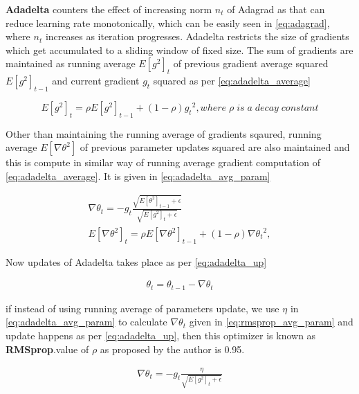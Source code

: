 \noindent \textbf{Adadelta}\cite{adadelta} counters the effect of increasing norm $n_t$ of Adagrad as that can reduce learning rate monotonically, which can be easily seen in \ref{eq:adagrad}, where $n_t$ increases as iteration progresses. Adadelta restricts the size of gradients which get accumulated to a sliding window of fixed size. The sum of gradients are maintained as running average $E[g^2]_t$ of previous gradient average squared $E[g^2]_{t-1}$  and current gradient ${g_t}$ squared as per \ref{eq:adadelta_average}

\begin{equation}\label{eq:adadelta_average}
E[g^2]_t=\rho E[g^2]_{t-1}+(1-\rho){g_t}^2, where \; \rho \; is \; a \; decay \; constant
\end{equation}

\noindent Other than maintaining the running average of gradients sqaured, running average $E[\nabla\theta^2]$  of previous parameter updates squared are also maintained and this is compute in similar way of running average gradient computation of \ref{eq:adadelta_average}. It is given in \ref{eq:adadelta_avg_param}

\begin{equation}\label{eq:adadelta_avg_param}
\begin{aligned}
\nabla\theta_{t}=-g_{t}\frac{\sqrt{E[\theta^2]_{t-1}+\epsilon}}{\sqrt{E[g^2]_{t}+\epsilon}}\\
E[\nabla\theta^2]_t=\rho E[\nabla\theta^2]_{t-1}+(1-\rho){\nabla\theta_t}^2,
\end{aligned}
\end{equation}

\noindent Now updates of Adadelta takes place as per \ref{eq:adadelta_up}

\begin{equation}\label{eq:adadelta_up}
\begin{aligned}
\theta_t=\theta_{t-1} - \nabla\theta_t
\end{aligned}
\end{equation}

\noindent if instead of using running average of parameters update, we use $\eta$ in \ref{eq:adadelta_avg_param} to calculate $\nabla\theta_t$ given in \ref{eq:rmsprop_avg_param} and update happens as per \ref{eq:adadelta_up}, then this optimizer is known as \textbf{RMSprop}.value of $\rho$ as proposed by the author is 0.95.

\begin{equation}\label{eq:rmsprop_avg_param}
\begin{aligned}
\nabla\theta_{t}=-g_{t}\frac{\eta}{\sqrt{E[g^2]_{t}+\epsilon}}\\
\end{aligned}
\end{equation}

